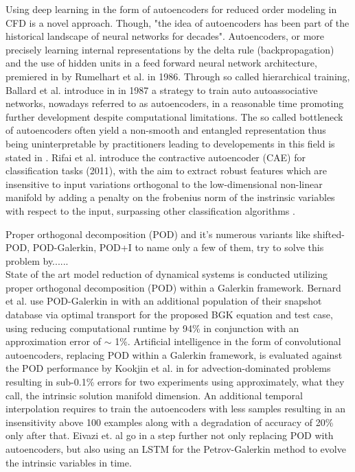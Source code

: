 Using deep learning in the form of autoencoders for reduced order modeling in CFD is a novel approach. Though, "the idea of autoencoders has been part of the historical landscape of neural networks for decades"\cite[p.493]{Goodfellow}. Autoencoders, or more precisely learning internal representations by the delta rule (backpropagation) and the use of hidden units in a feed forward neural network architecture, premiered in \cite{Rumelhart} by Rumelhart et al. in 1986. Through so called hierarchical training, Ballard et al. introduce in  \cite{Ballard} in 1987 a strategy to train auto autoassociative networks, nowadays referred to as autoencoders, in a reasonable time promoting further development despite computational limitations. The so called bottleneck of autoencoders often yield a non-smooth and entangled representation thus being uninterpretable by practitioners leading to developements in this field is stated in \cite{Rifai2011}. Rifai et al. introduce the contractive autoencoder (CAE) for classification tasks (2011), with the aim to extract robust features which are insensitive to input variations orthogonal to the low-dimensional non-linear manifold by adding a penalty on the frobenius norm of the instrinsic variables with respect to the input, surpassing other classification algorithms \cite{Rifai2011}. 

Proper orthogonal decomposition (POD) and it's numerous variants like shifted-POD\cite{bibid}, POD-Galerkin\cite{bibid}, POD+I \cite{bibid} to name only a few of them, try to solve this problem by......	\\
State of the art model reduction of dynamical systems is conducted utilizing proper orthogonal decomposition (POD) within a Galerkin framework. Bernard et al. use POD-Galerkin  in \cite{Bernard} with an additional population of their snapshot database via optimal transport for the proposed BGK equation and test case, using reducing computational runtime by 94\% in conjunction with an approximation error of \(\sim\) 1\%. Artificial intelligence in the form of convolutional autoencoders, replacing POD within a Galerkin framework, is evaluated against the POD performance by Kookjin et al. in \cite{Carlberg} for advection-dominated problems resulting in sub-0.1\% errors for two experiments using approximately, what they call, the intrinsic solution manifold dimension. An additional temporal interpolation requires to train the autoencoders with less samples resulting in an insensitivity above 100 examples along with a degradation of accuracy of 20\% only after that. Eivazi et. al go in \cite{eivazi2021recurrent} a step further not only replacing POD with autoencoders, but also using an LSTM for the Petrov-Galerkin method to evolve the intrinsic variables in time. 